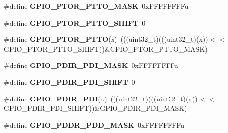 \begin{DoxyCompactItemize}
\item 
\#define {\bfseries G\+P\+I\+O\+\_\+\+P\+T\+O\+R\+\_\+\+P\+T\+T\+O\+\_\+\+M\+A\+SK}~0x\+F\+F\+F\+F\+F\+F\+F\+Fu\hypertarget{group__GPIO__Register__Masks_gaa75953b5d9d23bdaa6c24232e1a52680}{}\label{group__GPIO__Register__Masks_gaa75953b5d9d23bdaa6c24232e1a52680}

\item 
\#define {\bfseries G\+P\+I\+O\+\_\+\+P\+T\+O\+R\+\_\+\+P\+T\+T\+O\+\_\+\+S\+H\+I\+FT}~0\hypertarget{group__GPIO__Register__Masks_ga70e5442b3a119665aafb9e6e5b48bbd5}{}\label{group__GPIO__Register__Masks_ga70e5442b3a119665aafb9e6e5b48bbd5}

\item 
\#define {\bfseries G\+P\+I\+O\+\_\+\+P\+T\+O\+R\+\_\+\+P\+T\+TO}(x)~(((uint32\+\_\+t)(((uint32\+\_\+t)(x))$<$$<$G\+P\+I\+O\+\_\+\+P\+T\+O\+R\+\_\+\+P\+T\+T\+O\+\_\+\+S\+H\+I\+FT))\&G\+P\+I\+O\+\_\+\+P\+T\+O\+R\+\_\+\+P\+T\+T\+O\+\_\+\+M\+A\+SK)\hypertarget{group__GPIO__Register__Masks_ga40757476c8889ca9d4cb7017b6c5ab60}{}\label{group__GPIO__Register__Masks_ga40757476c8889ca9d4cb7017b6c5ab60}

\item 
\#define {\bfseries G\+P\+I\+O\+\_\+\+P\+D\+I\+R\+\_\+\+P\+D\+I\+\_\+\+M\+A\+SK}~0x\+F\+F\+F\+F\+F\+F\+F\+Fu\hypertarget{group__GPIO__Register__Masks_gacb7c8cc976937906c8e803811a7fbb68}{}\label{group__GPIO__Register__Masks_gacb7c8cc976937906c8e803811a7fbb68}

\item 
\#define {\bfseries G\+P\+I\+O\+\_\+\+P\+D\+I\+R\+\_\+\+P\+D\+I\+\_\+\+S\+H\+I\+FT}~0\hypertarget{group__GPIO__Register__Masks_ga99fd9212dd769bb1964a28a864c6c741}{}\label{group__GPIO__Register__Masks_ga99fd9212dd769bb1964a28a864c6c741}

\item 
\#define {\bfseries G\+P\+I\+O\+\_\+\+P\+D\+I\+R\+\_\+\+P\+DI}(x)~(((uint32\+\_\+t)(((uint32\+\_\+t)(x))$<$$<$G\+P\+I\+O\+\_\+\+P\+D\+I\+R\+\_\+\+P\+D\+I\+\_\+\+S\+H\+I\+FT))\&G\+P\+I\+O\+\_\+\+P\+D\+I\+R\+\_\+\+P\+D\+I\+\_\+\+M\+A\+SK)\hypertarget{group__GPIO__Register__Masks_ga8f80c8e42743151c73569b5cef49f2b2}{}\label{group__GPIO__Register__Masks_ga8f80c8e42743151c73569b5cef49f2b2}

\item 
\#define {\bfseries G\+P\+I\+O\+\_\+\+P\+D\+D\+R\+\_\+\+P\+D\+D\+\_\+\+M\+A\+SK}~0x\+F\+F\+F\+F\+F\+F\+F\+Fu\hypertarget{group__GPIO__Register__Masks_ga67567a60f48d2bfb5584cd8de8936788}{}\label{group__GPIO__Register__Masks_ga67567a60f48d2bfb5584cd8de8936788}


\end{DoxyCompactItemize}
